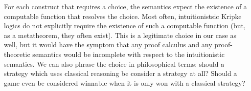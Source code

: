 For each construct that requires a choice, the semantics expect the existence of a computable function that resolves the choice.
Most often, intuitionistsic Kripke logics do not explicitly require the existence of such a computable function (but, as a metatheorem, they often exist).
This is a legitimate choice in our case as well, but it would have the symptom that any proof calculus and any proof-theoretic semantics would be incomplete with respect to the intuitionistic semantics.
We can also phrase the choice in philosophical terms: should a strategy which uses classical reasoning be consider a strategy at all?
Should a game even be considered winnable when it is only won with a classical strategy?





